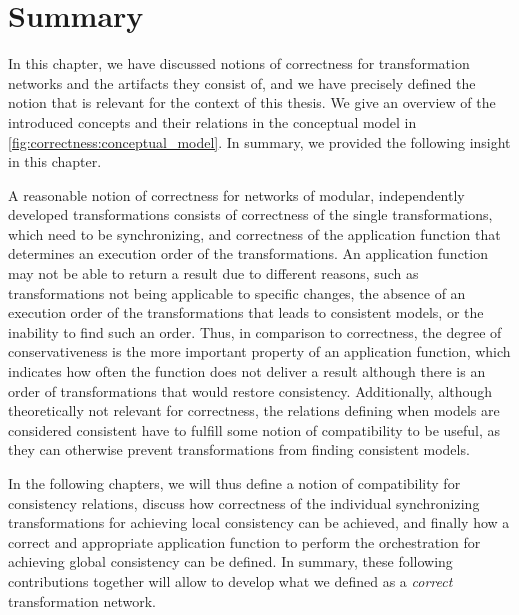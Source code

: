 \section{Summary}
\label{chap:correctness:summary}

In this chapter, we have discussed notions of correctness for transformation networks and the artifacts they consist of, and we have precisely defined the notion that is relevant for the context of this thesis.
We give an overview of the introduced concepts and their relations in the conceptual model in \autoref{fig:correctness:conceptual_model}.
In summary, we provided the following insight in this chapter.

\begin{insight}
    A reasonable notion of correctness for networks of modular, independently developed transformations consists of correctness of the single transformations, which need to be synchronizing, and correctness of the application function that determines an execution order of the transformations.
    An application function may not be able to return a result due to different reasons, such as transformations not being applicable to specific changes, the absence of an execution order of the transformations that leads to consistent models, or the inability to find such an order.
    Thus, in comparison to correctness, the degree of conservativeness is the more important property of an application function, which indicates how often the function does not deliver a result although there is an order of transformations that would restore consistency.
    Additionally, although theoretically not relevant for correctness, the relations defining when models are considered consistent have to fulfill some notion of compatibility to be useful, as they can otherwise prevent transformations from finding consistent models.
\end{insight}

In the following chapters, we will thus define a notion of compatibility for consistency relations, discuss how correctness of the individual synchronizing transformations for achieving local consistency can be achieved, and finally how a correct and appropriate application function to perform the orchestration for achieving global consistency can be defined.
In summary, these following contributions together will allow to develop what we defined as a \emph{correct} transformation network.

